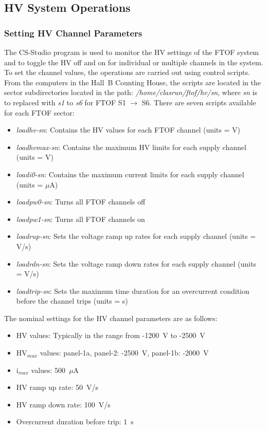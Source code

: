 \documentclass[12pt]{article}
\begin{document}
\subsection{HV System Operations}

\subsubsection{Setting HV Channel Parameters}
\label{hv-parms}

The CS-Studio program is used to monitor the HV settings of the FTOF system and to toggle the HV off
and on for individual or multiple channels in the system. To set the channel values, the operations
are carried out using control scripts. From the computers in the Hall~B Counting House, the scripts 
are located in the sector subdirectories located in the path: {\it /home/clasrun/ftof/hv/sn}, where
{\it sn} is to replaced with {\it s1} to {\it s6} for FTOF S1 $\to$ S6. There are seven scripts 
available for each FTOF sector:

\begin{itemize}
\item {\it loadhv-sn}: Contains the HV values for each FTOF channel (units = V)
\item {\it loadhvmax-sn}: Contains the maximum HV limits for each supply channel (units = V)
\item {\it loadi0-sn}: Contains the maximum current limits for each supply channel (units = $\mu$A)
\item {\it loadpw0-sn}: Turns all FTOF channels off
\item {\it loadpw1-sn}: Turns all FTOF channels on
\item {\it loadrup-sn}: Sets the voltage ramp up rates for each supply channel (units = V/s)
\item {\it loadrdn-sn}: Sets the voltage ramp down rates for each supply channel (units = V/s)
\item {\it loadtrip-sn}: Sets the maximum time duration for an overcurrent condition before the 
channel trips (units = s)
\end{itemize}

The nominal settings for the HV channel parameters are as follows:

\begin{itemize}
\item HV values: Typically in the range from -1200~V to -2500~V
\item HV$_{max}$ values: panel-1a, panel-2: -2500~V, panel-1b: -2000~V
\item i$_{max}$ values: 500~$\mu$A
\item HV ramp up rate: 50~V/s
\item HV ramp down rate: 100~V/s
\item Overcurrent duration before trip: 1~s
\end{itemize}
\end{document}
